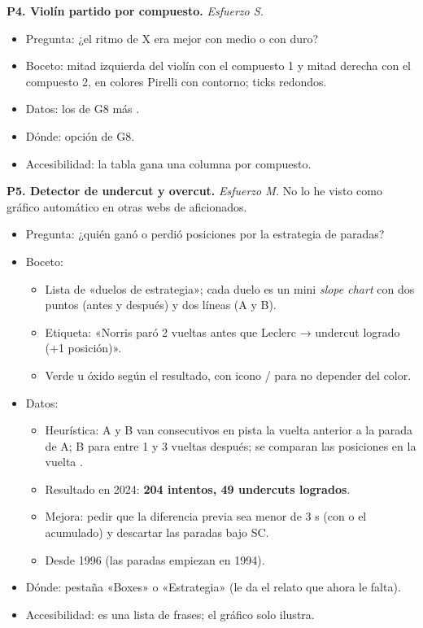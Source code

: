 \textbf{P4. Violín partido por compuesto.} \emph{Esfuerzo S.}

\begin{itemize}
\item Pregunta: ¿el ritmo de X era mejor con medio o con duro?
\item Boceto: mitad izquierda del violín con el compuesto 1 y mitad derecha con el compuesto 2, en colores Pirelli con contorno; ticks redondos.
\item Datos: los de G8 más .
\item Dónde: opción de G8.
\item Accesibilidad: la tabla gana una columna por compuesto.
\end{itemize}

\textbf{P5. Detector de undercut y overcut.} \emph{Esfuerzo M.} No lo he visto como gráfico automático en otras webs de aficionados.

\begin{itemize}
\item Pregunta: ¿quién ganó o perdió posiciones por la estrategia de paradas?
\item Boceto:
\begin{itemize}
\item Lista de «duelos de estrategia»; cada duelo es un mini \emph{slope chart} con dos puntos (antes y después) y dos líneas (A y B).
\item Etiqueta: «Norris paró 2 vueltas antes que Leclerc → undercut logrado (+1 posición)».
\item Verde u óxido según el resultado, con icono \si{}/\no{} para no depender del color.
\end{itemize}
\item Datos:
\begin{itemize}
\item Heurística: A y B van consecutivos en pista la vuelta anterior a la parada de A; B para entre 1 y 3 vueltas después; se comparan las posiciones en la vuelta .
\item Resultado en 2024: \textbf{204 intentos, 49 undercuts logrados}.
\item Mejora: pedir que la diferencia previa sea menor de 3 s (con  o el acumulado) y descartar las paradas bajo SC.
\item Desde 1996 (las paradas empiezan en 1994).
\end{itemize}
\item Dónde: pestaña «Boxes» o «Estrategia» (le da el relato que ahora le falta).
\item Accesibilidad: es una lista de frases; el gráfico solo ilustra.
\end{itemize}

